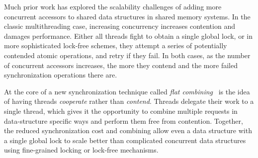 Much prior work has explored the scalability challenges of adding more concurrent accessors to shared data structures in shared memory systems.
In the classic multithreading case, increasing concurrency increases contention and damages performance.
Either all threads fight to obtain a single global lock, or in more sophisticated lock-free schemes, they attempt a series of potentially contended atomic operations, and retry if they fail. In both cases, as the number of concurrent accessors increases, the more they contend and the more failed synchronization operations there are.

At the core of a new synchronization technique called \emph{flat combining}~\cite{flatCombining} is the idea of having threads \emph{cooperate} rather than \emph{contend}.
Threads delegate their work to a single thread, which gives it the opportunity to combine multiple requests in data-structure specific ways and perform them free from contention.
Together, the reduced synchronization cost and combining allow even a data structure with a single global lock to scale better than complicated concurrent data structures using fine-grained locking or lock-free mechanisms.


